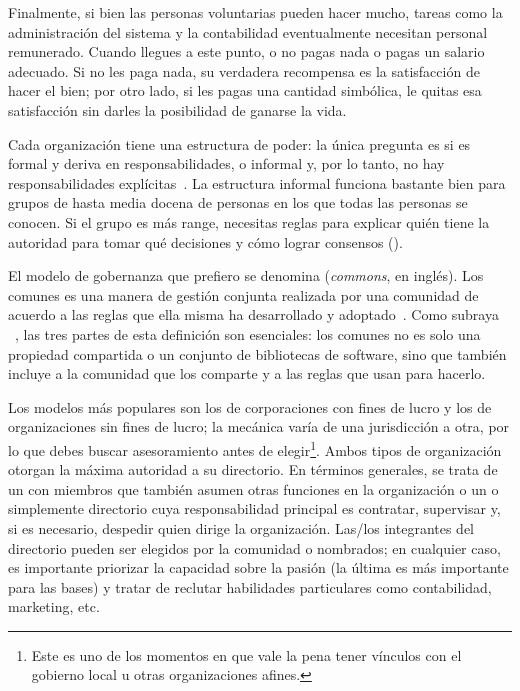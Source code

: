 Finalmente,
si bien  las personas voluntarias pueden hacer mucho,
tareas como la administración del sistema y la contabilidad eventualmente necesitan personal remunerado.
Cuando llegues a este punto, o no pagas nada o pagas un salario adecuado.
Si no les paga nada, su verdadera recompensa es la satisfacción de hacer el bien;
por otro lado, si les pagas una cantidad simbólica, le quitas esa satisfacción sin darles la posibilidad de ganarse la vida.


Cada organización tiene una estructura de poder:
la única pregunta es si es formal y deriva en responsabilidades, o informal y, por lo tanto, no hay responsabilidades explícitas~\cite{Free1972}.
La estructura informal funciona bastante bien para grupos de hasta media docena de personas
en los que todas las personas se conocen.
Si el grupo es más range,
necesitas reglas para explicar
quién tiene la autoridad para tomar qué decisiones
y cómo lograr consensos ().

El modelo de gobernanza que prefiero se denomina  (\emph{commons}, en inglés). Los comunes es una manera de gestión conjunta realizada por una comunidad
de acuerdo a las reglas que ella misma ha desarrollado y adoptado~\cite{Ostr2015}.
Como subraya ~\cite{Boll2014}, las tres partes de esta definición son esenciales:
los comunes no es solo una propiedad compartida o un conjunto de bibliotecas de software,
sino que también incluye a la comunidad que los comparte y a las reglas que usan para hacerlo.

Los modelos más populares son los de corporaciones con fines de lucro y los de organizaciones sin fines de lucro;
la mecánica varía de una jurisdicción a otra,
por lo que debes buscar asesoramiento antes de elegir\footnote{
  Este es uno de los momentos
  en que vale la pena tener vínculos con el gobierno local u otras organizaciones afines.}.
Ambos tipos de organización otorgan la máxima autoridad a su directorio.
En términos generales, se trata de un 
con miembros que también asumen otras funciones en la organización
o un  o simplemente directorio cuya 
responsabilidad principal es contratar, supervisar
y, si es necesario, despedir quien dirige la organización.
Las/los integrantes del directorio pueden ser elegidos por la comunidad o nombrados;
en cualquier caso, es importante priorizar la capacidad sobre la pasión
(la última es más importante para las bases)
y tratar de reclutar habilidades particulares como contabilidad, marketing, etc.


